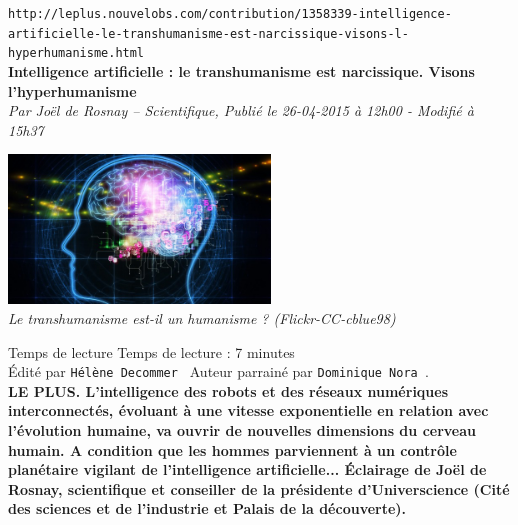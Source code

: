 \documentclass[11pt,twoside,a4paper]{article}
\begin{document}
\setlength\parindent{0pt}

\texttt{http://leplus.nouvelobs.com/contribution/1358339-intelligence-artificielle-le-transhumanisme-est-narcissique-visons-l-hyperhumanisme.html}~\\

\textbf{\LARGE Intelligence artificielle : le transhumanisme est narcissique. Visons l'hyperhumanisme} ~\\

\emph{\small Par Jo{\"e}l de Rosnay -- Scientifique, Publi{\'e} le 26-04-2015 {\`a} 12h00 - Modifi{\'e} {\`a} 15h37} ~\\



\begin{minipage}[ht]{7.00cm}
	\includegraphics[width=6.95cm]{img/2751429787165.jpg}~\\
	\emph{Le transhumanisme est-il un humanisme ? (Flickr-CC-cblue98)}
\end{minipage} \hfill \begin{minipage}[ht]{0.65\textwidth}
	Temps de lecture Temps de lecture : 7 minutes ~\\

	{\'E}dit{\'e} par \texttt{H{\'e}l{\`e}ne Decommer~\footnotemark}  Auteur parrain{\'e} par \texttt{Dominique Nora~\footnotemark}. ~\\

	\textbf{LE PLUS. L'intelligence des robots et des r{\'e}seaux num{\'e}riques interconnect{\'e}s, {\'e}voluant {\`a} une vitesse exponentielle en relation avec l'{\'e}volution humaine, va ouvrir de nouvelles dimensions du cerveau humain. A condition que les hommes parviennent {\`a} un contr{\^o}le plan{\'e}taire vigilant de l'intelligence artificielle... {\'E}clairage de Jo{\"e}l de Rosnay, scientifique et conseiller de la pr{\'e}sidente d'Universcience (Cit{\'e} des sciences et de l'industrie et Palais de la d{\'e}couverte). } ~\\
\end{minipage}~\\~\\
\end{document}
